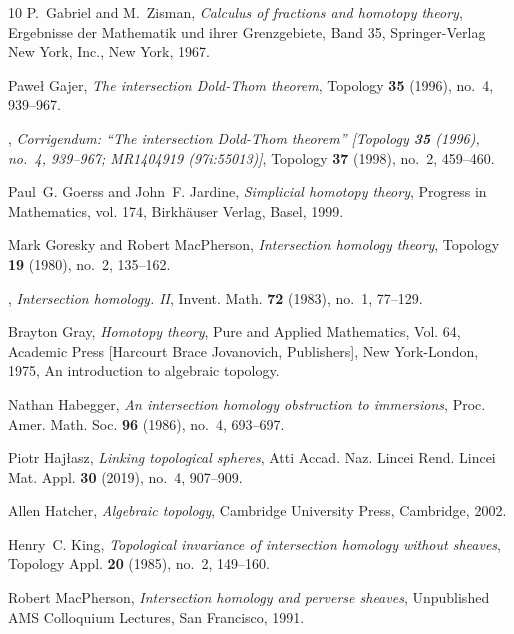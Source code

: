 \documentclass[a4paper,10pt,english,reqno]{amsart}
\theoremstyle{plain}
\theoremstyle{definition}
\theoremstyle{remark}
\numberwithin{equation}{section}
\renewcommand\1{\hbox{\ding{192}}}
\renewcommand\2{\hbox{\ding{193}}}
\newcommand\3{\hbox{\ding{194}}}
\newcommand\4{\hbox{\ding{195}}}
\begin{document}
\begin{thebibliography}{10}
P.~Gabriel and M.~Zisman, \emph{Calculus of fractions and homotopy theory},
  Ergebnisse der Mathematik und ihrer Grenzgebiete, Band 35, Springer-Verlag
  New York, Inc., New York, 1967. 

Pawe{\l} Gajer, \emph{The intersection {D}old-{T}hom theorem}, Topology
  \textbf{35} (1996), no.~4, 939--967. 

\bysame, \emph{Corrigendum: ``{T}he intersection {D}old-{T}hom theorem''
  [{T}opology {\bf 35} (1996), no.\ 4, 939--967; {MR}1404919 (97i:55013)]},
  Topology \textbf{37} (1998), no.~2, 459--460. 

Paul~G. Goerss and John~F. Jardine, \emph{Simplicial homotopy theory}, Progress
  in Mathematics, vol. 174, Birkh\"auser Verlag, Basel, 1999. 

Mark Goresky and Robert MacPherson, \emph{Intersection homology theory},
  Topology \textbf{19} (1980), no.~2, 135--162. 

\bysame, \emph{Intersection homology. {II}}, Invent. Math. \textbf{72} (1983),
  no.~1, 77--129. 

Brayton Gray, \emph{Homotopy theory}, Pure and Applied Mathematics, Vol. 64,
  Academic Press [Harcourt Brace Jovanovich, Publishers], New York-London,
  1975, An introduction to algebraic topology. 

Nathan Habegger, \emph{An intersection homology obstruction to immersions},
  Proc. Amer. Math. Soc. \textbf{96} (1986), no.~4, 693--697. 

Piotr Haj{\l}asz, \emph{Linking topological spheres}, Atti Accad. Naz. Lincei
  Rend. Lincei Mat. Appl. \textbf{30} (2019), no.~4, 907--909. 

Allen Hatcher, \emph{Algebraic topology}, Cambridge University Press,
  Cambridge, 2002. 

Henry~C. King, \emph{Topological invariance of intersection homology without
  sheaves}, Topology Appl. \textbf{20} (1985), no.~2, 149--160. 

Robert MacPherson, \emph{Intersection homology and perverse sheaves},
  Unpublished AMS Colloquium Lectures, San Francisco, 1991.


\end{thebibliography}
\end{document}
